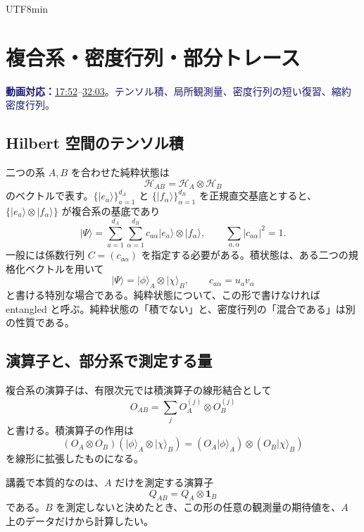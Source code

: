 \documentclass[11pt,a4paper]{article}
\numberwithin{equation}{section}
\newcommand{\I}{\mathbf{1}}
\newcommand{\ket}[1]{\lvert#1\rangle}
\newcommand{\vid}[2]{\href{https://www.youtube.com/watch?v=3gDSaNy1O7Y\&t=#1s}{#2}}
\newcommand{\source}[1]{\par\noindent\textcolor{MidnightBlue}{\textbf{動画対応：}#1}\par}
\begin{document}
\begin{CJK*}{UTF8}{min}
\section{複合系・密度行列・部分トレース}
\label{sec:composite}
\source{\vid{1072}{17:52}--\vid{1923}{32:03}。テンソル積、局所観測量、密度行列の短い復習、縮約密度行列。}
\subsection{Hilbert 空間のテンソル積}
二つの系 $A,B$ を合わせた純粋状態は
\begin{equation}
\mathcal H_{AB}=\mathcal H_A\otimes\mathcal H_B
\label{eq:tensor}
\end{equation}
のベクトルで表す。$\{\ket{e_a}\}_{a=1}^{d_A}$ と $\{\ket{f_\alpha}\}_{\alpha=1}^{d_B}$ を正規直交基底とすると、$\{\ket{e_a}\otimes\ket{f_\alpha}\}$ が複合系の基底であり
\begin{equation}
\ket{\Psi}=\sum_{a=1}^{d_A}\sum_{\alpha=1}^{d_B}
c_{a\alpha}\ket{e_a}\otimes\ket{f_\alpha},
\qquad \sum_{a,\alpha}|c_{a\alpha}|^2=1.
\label{eq:generalpsi}
\end{equation}
一般には係数行列 $C=(c_{a\alpha})$ を指定する必要がある。積状態は、ある二つの規格化ベクトルを用いて
\begin{equation}
\ket{\Psi}=\ket{\phi}_A\otimes\ket{\chi}_B,
\qquad c_{a\alpha}=u_a v_\alpha
\label{eq:product}
\end{equation}
と書ける特別な場合である。純粋状態について、この形で書けなければ entangled と呼ぶ。純粋状態の「積でない」と、密度行列の「混合である」は別の性質である。

\subsection{演算子と、部分系で測定する量}
複合系の演算子は、有限次元では積演算子の線形結合として
\begin{equation}
O_{AB}=\sum_j O_A^{(j)}\otimes O_B^{(j)}
\end{equation}
と書ける。積演算子の作用は
\begin{equation}
(O_A\otimes O_B)(\ket{\phi}_A\otimes\ket{\chi}_B)
=(O_A\ket{\phi}_A)\otimes(O_B\ket{\chi}_B)
\end{equation}
を線形に拡張したものになる。

講義で本質的なのは、$A$ だけを測定する演算子
\begin{equation}
Q_{AB}=Q_A\otimes\I_B
\label{eq:localobs}
\end{equation}
である。$B$ を測定しないと決めたとき、この形の任意の観測量の期待値を、$A$ 上のデータだけから計算したい。


\end{CJK*}
\end{document}
